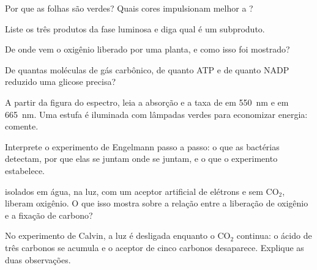 \begin{exercise}[$\star$]\label{exo:g12:photosynthesis:2}
Por que as folhas são verdes? Quais cores impulsionam melhor a ?
\end{exercise}

\begin{exercise}[$\star$]\label{exo:g12:photosynthesis:3}
Liste os três produtos da fase luminosa e diga qual é um subproduto.
\end{exercise}

\begin{exercise}[$\star$]\label{exo:g12:photosynthesis:4}
De onde vem o oxigênio liberado por uma planta, e como isso foi
mostrado?
\end{exercise}

\begin{exercise}[$\star$]\label{exo:g12:photosynthesis:5}
De quantas moléculas de gás carbônico, de quanto ATP e de quanto NADP
reduzido uma glicose precisa?
\end{exercise}

\begin{exercise}[$\star\star$]\label{exo:g12:photosynthesis:6}
A partir da figura do espectro, leia a absorção e a taxa de
 em \qty{550}{nm} e em \qty{665}{nm}. Uma estufa é
iluminada com lâmpadas verdes para economizar energia: comente.
\end{exercise}

\begin{exercise}[$\star\star$]\label{exo:g12:photosynthesis:7}
Interprete o experimento de Engelmann passo a passo: o que as bactérias
detectam, por que elas se juntam onde se juntam, e o que o experimento
estabelece.
\end{exercise}

\begin{exercise}[$\star\star$]\label{exo:g12:photosynthesis:8}
 isolados em água, na luz, com um aceptor artificial de
elétrons e sem $\mathrm{CO_2}$, liberam oxigênio. O que isso mostra
sobre a relação entre a liberação de oxigênio e a fixação de carbono?
\end{exercise}

\begin{exercise}[$\star\star$]\label{exo:g12:photosynthesis:9}
No experimento de Calvin, a luz é desligada enquanto o $\mathrm{CO_2}$
continua: o ácido de três carbonos se acumula e o aceptor de cinco
carbonos desaparece. Explique as duas observações.
\end{exercise}

